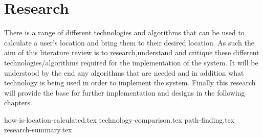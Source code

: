 \section{Research}
There is a range of different technologies and algorithms that can be used to calculate a user’s location and bring them to their desired location. As such the aim of this literature review is to research,understand and critique these different technologies/algorithms required for the implementation of the system. It will be understood by the end any algorithms that are needed and in addition what technology is being used in order to implement the system. Finally this research will provide the base for further implementation and designs in the following chapters.
		
{how-is-location-calculated.tex}
{technology-comparison.tex}
{path-finding.tex}
{research-summary.tex}
		